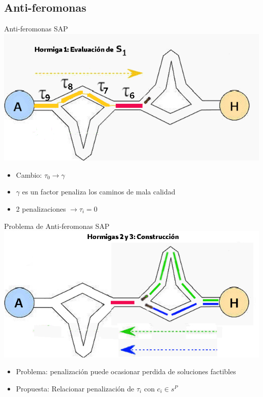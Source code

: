 \subsection{Anti-feromonas}
\begin{frame}{Anti-feromonas SAP}
\centering
\includegraphics[scale=0.4]{Pictures/ACO-ant-ferom-penalize.png}
    \begin{itemize}
        \item Cambio: $\tau_0 \longrightarrow \gamma$
        \item $\gamma$ es un factor penaliza los caminos de mala calidad
        \item 2 penalizaciones $\longrightarrow \tau_i = 0$ 
    \end{itemize}
\end{frame}

\begin{frame}{Problema de Anti-feromonas SAP}
\centering
\includegraphics[scale=0.4]{Pictures/ACO-ant-constr-penalize.png}
    \begin{itemize}
        \item Problema: penalizaci\'on puede ocasionar perdida de soluciones factibles
        \item Propuesta: Relacionar penalizaci\'on de $\tau_i$ con $c_i \in s^P$
    \end{itemize}
\end{frame}

